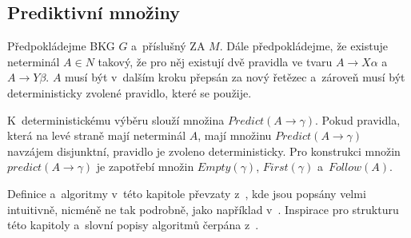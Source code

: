 \subsection*{Prediktivní množiny}
Předpokládejme BKG $G$ a~příslušný ZA $M$.
Dále předpokládejme, že existuje neterminál $A \in N$ takový, že pro něj existují dvě pravidla ve tvaru $A \rightarrow X\alpha$ a~$A \rightarrow Y\beta$.
$A$ musí být v~dalším kroku přepsán za nový řetězec a~zároveň musí být deterministicky zvolené pravidlo, které se použije.

K~deterministickému výběru slouží množina $Predict(A \rightarrow \gamma)$.
Pokud pravidla, která na levé straně mají neterminál $A$, mají množinu $Predict(A \rightarrow \gamma)$ navzájem disjunktní, pravidlo je zvoleno deterministicky.
Pro konstrukci množin $predict(A \rightarrow \gamma)$ je zapotřebí množin $Empty(\gamma)$, $First(\gamma)$ a~$Follow(A)$. 

Definice a~algoritmy v~této kapitole převzaty z~\cite{meduna2017sa-shora-dolu,kunda2022}, kde jsou popsány velmi intuitivně, nicméně ne tak podrobně, jako například v~\cite{medunaElementsOfCompDesign}.
Inspirace pro strukturu této kapitoly a~slovní popisy algoritmů čerpána z~\cite{kunda2022}.

